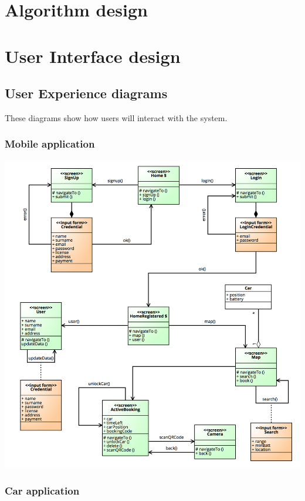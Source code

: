 \documentclass[]{article}
\begin{document}
\section{Algorithm design}\label{algorithm-design}

\section{User Interface design}\label{user-interface-design}

\subsection{User Experience diagrams}\label{user-experience-diagrams}

These diagrams show how users will interact with the system.

\subsubsection{Mobile application}\label{mobile-application-1}

\centerline{\includegraphics{./images/UX_Mobile.png}}

\subsubsection{Car application}\label{car-application}
\end{document}
